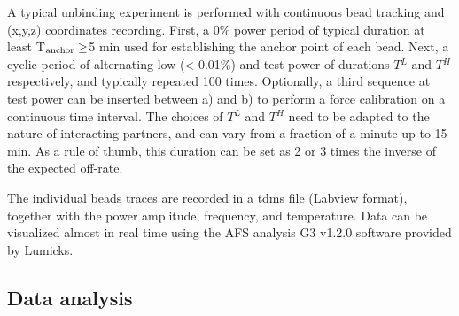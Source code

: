 \documentclass{biophys-new}
\begin{document}
A typical unbinding experiment is performed with continuous bead tracking and (x,y,z) coordinates recording. First, a 0\% power period of typical duration at least T$_{\rm anchor}\ge$5 min used for establishing the anchor point of each bead. Next, a cyclic period of alternating low (< 0.01\%) and test power of durations $T{^L}$ and $T{^H}$ respectively, and typically repeated 100 times. Optionally, a third sequence at test power can be inserted between a) and b) to perform a force calibration on a continuous time interval. The choices of $T{^L}$ and $T{^H}$ need to be adapted to the nature of interacting partners, and can vary from a fraction of a minute up to 15 min. As a rule of thumb, this duration can be set as 2 or 3 times the inverse of the expected off-rate.

The individual beads traces are recorded in a tdms file (Labview format), together with the power amplitude, frequency, and temperature. Data can be visualized almost in real time using the AFS analysis G3 v1.2.0 software provided by Lumicks.%



\subsection*{Data analysis}

\end{document}

